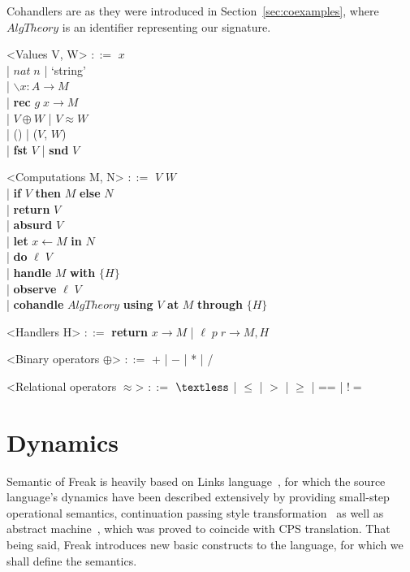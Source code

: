 \documentclass[declaration,shortabstract]{iithesis}
\theoremstyle{definition} \newtheorem{definition}{Definition}[chapter]
\theoremstyle{remark} \newtheorem{remark}[definition]{Observation}
\theoremstyle{plain} \newtheorem{theorem}[definition]{Theorem}
\theoremstyle{plain} \newtheorem{lemma}[definition]{Lemma}
\begin{document}
    Cohandlers are as they were introduced in Section~\ref{sec:coexamples},
    where $AlgTheory$ is an identifier representing our signature.

    \begin{grammar}

        <Values V, W> $::=$ $ x $ \\
            | $nat \; n$ | `string'  \\
            | $ \backslash x : A \rightarrow M $ \\
            | \textbf{rec} $ g \; x \rightarrow M $\\
            | $V \oplus W$ | $V \approx W$ \\
            | () | ($V$, $W$) \\
            | \textbf{fst} $V$ | \textbf{snd} $V$

        <Computations M, N> $::=$ $ V $ $ W $ \\
            | \textbf{if} $V$ \textbf{then} $M$ \textbf{else} $N$ \\
            | \textbf{return} $V$ \\
            | \textbf{absurd} $ V $ \\
            | \textbf{let} $ x \leftarrow M $ \textbf{in} $ N $ \\
            | \textbf{do} $\ell \; V$ \\
            | \textbf{handle} $M$ \textbf{with} $ \{ H \} $ \\
            | \textbf{observe} $\ell \; V$ \\
            | \textbf{cohandle} $AlgTheory$ \textbf{using} $V$ \textbf{at} $M$ \textbf{through} $ \{ H \} $

        <Handlers H> $::=$ \textbf{return} $ x \rightarrow M $ | $ \ell \; p \; r \rightarrow M, H $

        <Binary operators $\oplus$> $::=$ + | $-$ | * | /

        <Relational operators $\approx$> $::=$ $ \textless $ | $\leqslant$ | $>$ | $\geqslant$ | == | $!= $

    \end{grammar}

\section{Dynamics}

    Semantic of Freak is heavily based on Links language~\cite{handlers-cps-journal},
    for which the source language's dynamics have been described extensively by
    providing small-step operational semantics, continuation passing style
    transformation~\cite{handlers-cps} as well as abstract
    machine~\cite{liberating-effects}, which was proved to coincide with CPS
    translation. That being said, Freak introduces new basic constructs to the
    language, for which we shall define the semantics.
\end{document}
